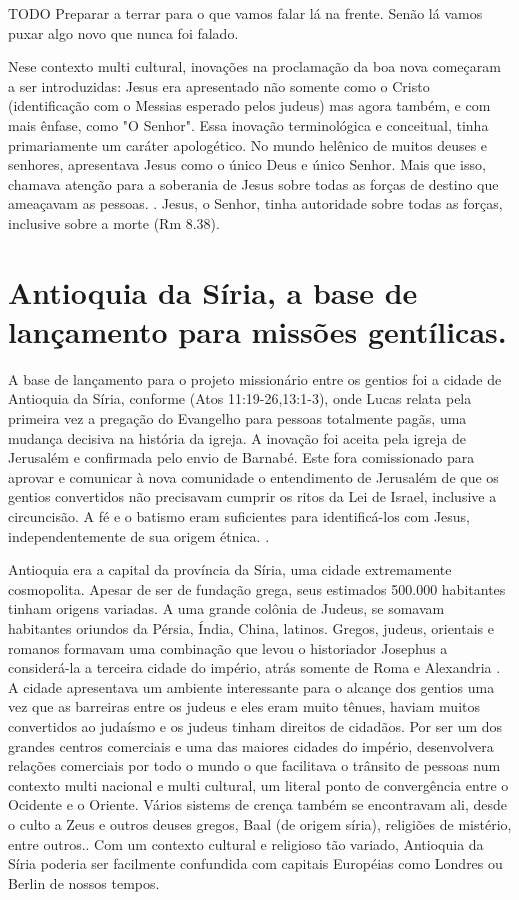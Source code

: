 \documentclass[
	12pt,				%
	openright,			%
	twoside,			%
	a4paper,			%
	english,			%
	french,				%
	spanish,			%
	brazil				%
	]{abntex2}
\begin{document}
TODO Preparar a terrar para o que vamos falar lá na frente. Senão lá vamos puxar algo novo que nunca foi falado.

Nese contexto multi cultural, inovações na proclamação da boa nova começaram a ser introduzidas: Jesus era apresentado não somente como o Cristo (identificação com o Messias esperado pelos judeus) mas agora também, e com mais ênfase, como "O Senhor". Essa inovação terminológica e conceitual, tinha primariamente um caráter apologético. No mundo helênico de muitos deuses e senhores, apresentava Jesus como o único Deus e único Senhor. Mais que isso, chamava atenção para a soberania de Jesus sobre todas as forças de destino que ameaçavam as pessoas. \cite[170]{green}. Jesus, o Senhor, tinha autoridade sobre todas as forças, inclusive sobre a morte (Rm 8.38).

\section{Antioquia da Síria, a base de lançamento para missões gentílicas.}

A base de lançamento para o projeto missionário entre os gentios foi a cidade de Antioquia da Síria, conforme (Atos 11:19-26,13:1-3), onde Lucas relata pela primeira vez a pregação do Evangelho para pessoas totalmente pagãs, uma mudança decisiva na história da igreja. A inovação foi aceita pela igreja de Jerusalém e confirmada pelo envio de Barnabé. Este fora comissionado para aprovar e comunicar à nova comunidade o entendimento de Jerusalém de que os gentios convertidos não precisavam cumprir os ritos da Lei de Israel, inclusive a circuncisão. A fé e o batismo eram suficientes para identificá-los com Jesus, independentemente de sua origem étnica. \cite[198]{green}.


Antioquia era a capital da província da Síria, uma cidade extremamente cosmopolita. Apesar de ser de fundação grega, seus estimados 500.000 habitantes tinham origens variadas. A uma grande colônia de Judeus, se somavam habitantes oriundos da Pérsia, Índia, China, latinos. Gregos, judeus, orientais e romanos formavam uma combinação que levou o historiador Josephus a considerá-la a terceira cidade do império, atrás somente de Roma e Alexandria \cite[185]{stott}. A cidade apresentava um ambiente interessante para o alcançe dos gentios uma vez que as barreiras entre os judeus e eles eram muito tênues, haviam muitos convertidos ao judaísmo e os judeus tinham direitos de cidadãos. Por ser um dos grandes centros comerciais e uma das maiores cidades do império, desenvolvera relações comerciais por todo o mundo o que facilitava o trânsito de pessoas num contexto multi nacional e multi cultural, um literal ponto de convergência entre o Ocidente e o Oriente. Vários sistems de crença também se encontravam ali, desde o culto a Zeus e outros deuses gregos, Baal (de origem síria), religiões de mistério, entre outros.\cite[166,167]{green}. Com um contexto cultural e religioso tão variado, Antioquia da Síria poderia ser facilmente  confundida com capitais Européias como Londres ou Berlin de nossos tempos.
\end{document}
